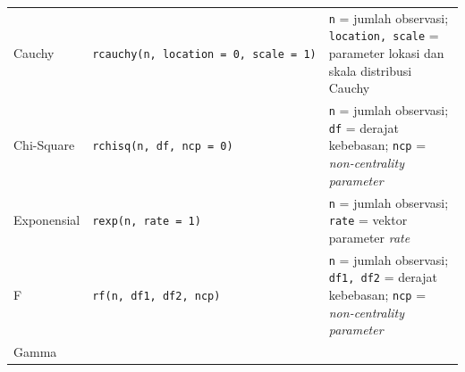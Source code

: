 \documentclass[]{book}
\theoremstyle{definition}
\theoremstyle{definition}
\theoremstyle{definition}
\theoremstyle{remark}
\begin{document}
\begin{longtable}[]{@{}lll@{}}
\begin{minipage}[t]{0.07\columnwidth}
Cauchy\strut
\end{minipage} & \begin{minipage}[t]{0.19\columnwidth}\raggedright
\texttt{rcauchy(n,\ location\ =\ 0,\ scale\ =\ 1)}\strut
\end{minipage} & \begin{minipage}[t]{0.65\columnwidth}\raggedright
\texttt{n} = jumlah observasi; \texttt{location,\ scale} = parameter lokasi dan skala distribusi Cauchy\strut
\end{minipage}\tabularnewline
\begin{minipage}[t]{0.07\columnwidth}\raggedright
Chi-Square\strut
\end{minipage} & \begin{minipage}[t]{0.19\columnwidth}\raggedright
\texttt{rchisq(n,\ df,\ ncp\ =\ 0)}\strut
\end{minipage} & \begin{minipage}[t]{0.65\columnwidth}\raggedright
\texttt{n} = jumlah observasi; \texttt{df} = derajat kebebasan; \texttt{ncp} = \emph{non-centrality parameter}\strut
\end{minipage}\tabularnewline
\begin{minipage}[t]{0.07\columnwidth}\raggedright
Exponensial\strut
\end{minipage} & \begin{minipage}[t]{0.19\columnwidth}\raggedright
\texttt{rexp(n,\ rate\ =\ 1)}\strut
\end{minipage} & \begin{minipage}[t]{0.65\columnwidth}\raggedright
\texttt{n} = jumlah observasi; \texttt{rate} = vektor parameter \emph{rate}\strut
\end{minipage}\tabularnewline
\begin{minipage}[t]{0.07\columnwidth}\raggedright
F\strut
\end{minipage} & \begin{minipage}[t]{0.19\columnwidth}\raggedright
\texttt{rf(n,\ df1,\ df2,\ ncp)}\strut
\end{minipage} & \begin{minipage}[t]{0.65\columnwidth}\raggedright
\texttt{n} = jumlah observasi; \texttt{df1,\ df2} = derajat kebebasan; \texttt{ncp} = \emph{non-centrality parameter}\strut
\end{minipage}\tabularnewline
\begin{minipage}[t]{0.07\columnwidth}\raggedright
Gamma\strut
\end{minipage} & \begin{minipage}[t]{0.19\columnwidth}\raggedright

\end{minipage}
\end{longtable}
\end{document}
